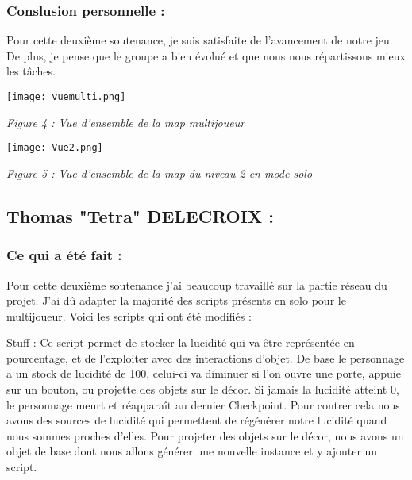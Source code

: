 \documentclass{article}
\begin{document}
\quad

\quad

		\subsubsection{Conslusion personnelle :}

\quad

\quad

Pour cette deuxième soutenance, je suis satisfaite de l’avancement de notre jeu. De plus, je pense que le groupe a bien évolué et que nous nous répartissons mieux les tâches.
\quad

\quad


\quad

\begin{centering}

\texttt{[image: vuemulti.png]}

\quad

\textit{Figure 4 : Vue d'ensemble de la map multijoueur }

\end{centering}


\quad

\begin{centering}

\texttt{[image: Vue2.png]}

\quad

\textit{Figure 5 : Vue d'ensemble de la map du niveau 2 en mode solo }

\end{centering}

\newpage

	\subsection{Thomas "Tetra" DELECROIX :}

\quad


		\subsubsection{Ce qui a été fait :}

\quad

\quad

Pour cette deuxième soutenance j’ai beaucoup travaillé sur la partie réseau du projet. J’ai dû adapter la majorité des scripts présents en solo pour le multijoueur. Voici les scripts qui ont été modifiés :

Stuff : Ce script permet de stocker la lucidité qui va être représentée en pourcentage, et de l’exploiter avec des interactions d’objet. De base le personnage a un stock de lucidité de 100, celui-ci va diminuer si l’on ouvre une porte, appuie sur un bouton, ou projette des objets sur le décor. Si jamais la lucidité atteint 0, le personnage meurt et réapparaît au dernier Checkpoint. Pour contrer cela nous avons des sources de lucidité qui permettent de régénérer notre lucidité quand nous sommes proches d’elles. Pour projeter des objets sur le décor, nous avons un objet de base dont nous allons générer une nouvelle instance et y ajouter un script.
\end{document}
